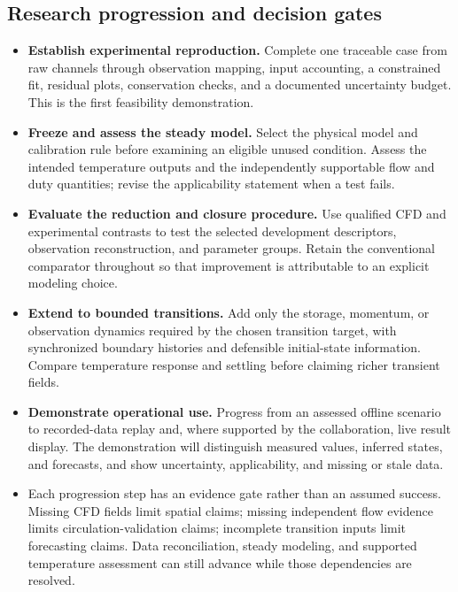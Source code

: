 \subsection{Research progression and decision gates}\label{subsec:research-progression-and-decision-gates}
\begin{itemize}[leftmargin=*]
\item \textbf{Establish experimental reproduction.} Complete one traceable case from raw channels through observation mapping, input accounting, a constrained fit, residual plots, conservation checks, and a documented uncertainty budget. This is the first feasibility demonstration.
\item \textbf{Freeze and assess the steady model.} Select the physical model and calibration rule before examining an eligible unused condition. Assess the intended temperature outputs and the independently supportable flow and duty quantities; revise the applicability statement when a test fails.
\item \textbf{Evaluate the reduction and closure procedure.} Use qualified CFD and experimental contrasts to test the selected development descriptors, observation reconstruction, and parameter groups. Retain the conventional comparator throughout so that improvement is attributable to an explicit modeling choice.
\item \textbf{Extend to bounded transitions.} Add only the storage, momentum, or observation dynamics required by the chosen transition target, with synchronized boundary histories and defensible initial-state information. Compare temperature response and settling before claiming richer transient fields.
\item \textbf{Demonstrate operational use.} Progress from an assessed offline scenario to recorded-data replay and, where supported by the collaboration, live result display. The demonstration will distinguish measured values, inferred states, and forecasts, and show uncertainty, applicability, and missing or stale data.\cite{kapteyn2021digitaltwins}
\item Each progression step has an evidence gate rather than an assumed success. Missing CFD fields limit spatial claims; missing independent flow evidence limits circulation-validation claims; incomplete transition inputs limit forecasting claims. Data reconciliation, steady modeling, and supported temperature assessment can still advance while those dependencies are resolved.
\end{itemize}


